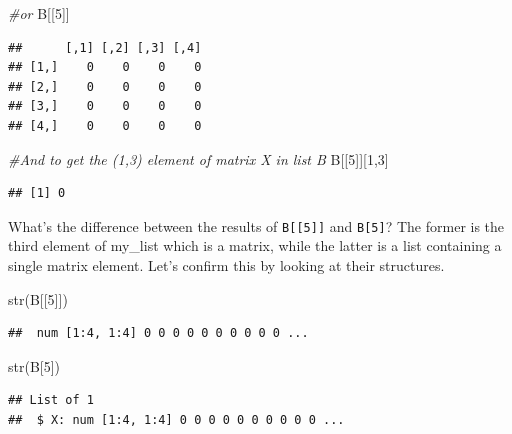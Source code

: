 \documentclass[
]{book}
\newenvironment{Shaded}{\begin{snugshade}}{\end{snugshade}}
\newcommand{\CommentTok}[1]{\textcolor[rgb]{0.56,0.35,0.01}{\textit{#1}}}
\newcommand{\DecValTok}[1]{\textcolor[rgb]{0.00,0.00,0.81}{#1}}
\newcommand{\FunctionTok}[1]{\textcolor[rgb]{0.00,0.00,0.00}{#1}}
\newcommand{\NormalTok}[1]{#1}
\begin{document}
\begin{Shaded}
\begin{Highlighting}[]
\CommentTok{\#or}
\NormalTok{B[[}\DecValTok{5}\NormalTok{]]}
\end{Highlighting}
\end{Shaded}

\begin{verbatim}
##      [,1] [,2] [,3] [,4]
## [1,]    0    0    0    0
## [2,]    0    0    0    0
## [3,]    0    0    0    0
## [4,]    0    0    0    0
\end{verbatim}

\begin{Shaded}
\begin{Highlighting}[]
\CommentTok{\#And to get the (1,3) element of matrix X in list B}
\NormalTok{B[[}\DecValTok{5}\NormalTok{]][}\DecValTok{1}\NormalTok{,}\DecValTok{3}\NormalTok{]}
\end{Highlighting}
\end{Shaded}

\begin{verbatim}
## [1] 0
\end{verbatim}

What's the difference between the results of \texttt{B{[}{[}5{]}{]}} and \texttt{B{[}5{]}}? The former is the third element of my\_list which is a matrix, while the latter is a list containing a single matrix element. Let's confirm this by looking at their structures.

\begin{Shaded}
\begin{Highlighting}[]
\FunctionTok{str}\NormalTok{(B[[}\DecValTok{5}\NormalTok{]])}
\end{Highlighting}
\end{Shaded}

\begin{verbatim}
##  num [1:4, 1:4] 0 0 0 0 0 0 0 0 0 0 ...
\end{verbatim}

\begin{Shaded}
\begin{Highlighting}[]
\FunctionTok{str}\NormalTok{(B[}\DecValTok{5}\NormalTok{])}
\end{Highlighting}
\end{Shaded}

\begin{verbatim}
## List of 1
##  $ X: num [1:4, 1:4] 0 0 0 0 0 0 0 0 0 0 ...
\end{verbatim}
\end{document}

